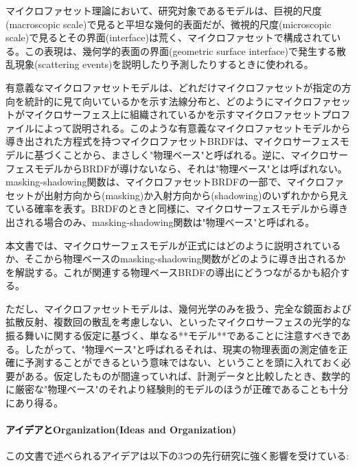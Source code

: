 \documentclass[a4paper,xelatex,ja=standard]{bxjsarticle}
\begin{document}
マイクロファセット理論において、研究対象であるモデルは、巨視的尺度(macroscopic scale)で見ると平坦な幾何的表面だが、微視的尺度(microscopic scale)で見るとその界面(interface)は荒く、マイクロファセットで構成されている。この表現は、幾何学的表面の界面(geometric surface interface)で発生する散乱現象(scattering events)を説明したり予測したりするときに使われる。

有意義なマイクロファセットモデルは、どれだけマイクロファセットが指定の方向を統計的に見て向いているかを示す法線分布と、どのようにマイクロファセットがマイクロサーフェス上に組織されているかを示すマイクロファセットプロファイルによって説明される。このような有意義なマイクロファセットモデルから導き出された方程式を持つマイクロファセットBRDFは、マイクロサーフェスモデルに基づくことから、まさしく"物理ベース"と呼ばれる。逆に、マイクロサーフェスモデルからBRDFが導けないなら、それは"物理ベース"とは呼ばれない。masking-shadowing関数は、マイクロファセットBRDFの一部で、マイクロファセットが出射方向から(masking)か入射方向から(shadowing)のいずれかから見えている確率を表す。BRDFのときと同様に、マイクロサーフェスモデルから導き出される場合のみ、masking-shadowing関数は"物理ベース"と呼ばれる。

本文書では、マイクロサーフェスモデルが正式にはどのように説明されているか、そこから物理ベースのmasking-shadowing関数がどのように導き出されるかを解説する。これが関連する物理ベースBRDFの導出にどうつながるかも紹介する。

ただし、マイクロファセットモデルは、幾何光学のみを扱う、完全な鏡面および拡散反射、複数回の散乱を考慮しない、といったマイクロサーフェスの光学的な振る舞いに関する仮定に基づく、単なる**モデル**であることに注意すべきである。したがって、"物理ベース"と呼ばれるそれは、現実の物理表面の測定値を正確に予測することができるという意味ではない、ということを頭に入れておく必要がある。仮定したものが間違っていれば、計測データと比較したとき、数学的に厳密な"物理ベース"のそれより経験則的モデルのほうが正確であることも十分にあり得る。

\paragraph{アイデアとOrganization(Ideas and Organization)}

この文書で述べられるアイデアは以下の3つの先行研究に強く影響を受けている:
\end{document}
